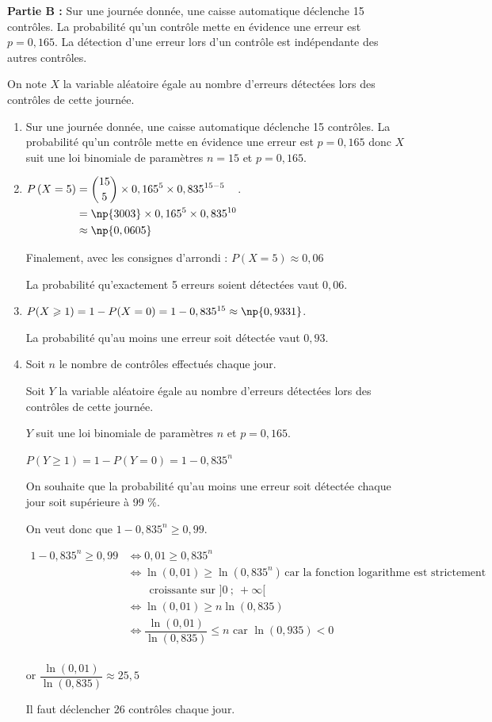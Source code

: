 \textbf{Partie B :}
Sur une journée donnée, une caisse automatique déclenche 15 contrôles. La probabilité qu'un contrôle mette en évidence une erreur est $p=0,165$. La détection d'une erreur lors d'un contrôle est indépendante des autres contrôles.

On note $X$ la variable aléatoire égale au nombre d'erreurs détectées lors des contrôles de cette journée.

\begin{enumerate}
\item Sur une journée donnée, une caisse automatique déclenche 15 contrôles. La probabilité qu'un contrôle mette en évidence une erreur est $p=0,165$ donc $X$ suit une loi binomiale de paramètres $n=15$ et $p=0,165$. 
\item $\begin{aligned}[t] P\left(X=5\right)
& = \displaystyle \binom{15}{5}\times 0,165^{5}\times 0,835^{15 - 5}\\
& = \np{3003}\times 0,165^{5} \times 0,835^{10} \\
& \approx \np{0,0605}
\end{aligned}$.

Finalement, avec les consignes d'arrondi : \quad $P\left(X=5\right) \approx 0,06$

La probabilité qu'exactement 5 erreurs soient détectées vaut $0,06$.

\item  $P(X\geqslant 1)=1-P(X=0)= 1- 0,835^
{15} \approx \np{0,9331}$.

La probabilité qu'au moins une erreur soit détectée vaut $0,93$.

\item Soit $n$ le nombre de contrôles effectués chaque jour.

Soit $Y$ la variable aléatoire égale au nombre d'erreurs détectées lors des contrôles de cette journée.

$Y$ suit une loi binomiale de paramètres $n$ et $p=0,165$.

$P(Y\geqslant 1)=1-P(Y=0)= 1- 0,835^n$

On souhaite que la probabilité qu'au moins une erreur soit détectée chaque jour soit supérieure à 99 \%.

On veut donc que $1- 0,835^n \geqslant 0,99$.

$\begin{aligned} 1- 0,835^n \geqslant 0,99 & \iff 0,01 \geqslant 0,835^n\\
& \iff \ln(0,01)\geqslant \ln \left(0,835^n\right) \, \text{car la fonction logarithme est strictement}\\
& \qquad \text{croissante sur } ]0~;~+\infty[\\
 &\iff \ln (0,01)\geqslant n \ln \left(0,835\right)\\
& \iff \dfrac{\ln(0,01)}{\ln(0,835)} \leqslant n \text{ car } \ln(0,935)<0\\
\end{aligned}$

or $ \dfrac{\ln(0,01)}{\ln(0,835)} \approx 25,5$

Il faut déclencher 26 contrôles chaque jour.
\end{enumerate}

